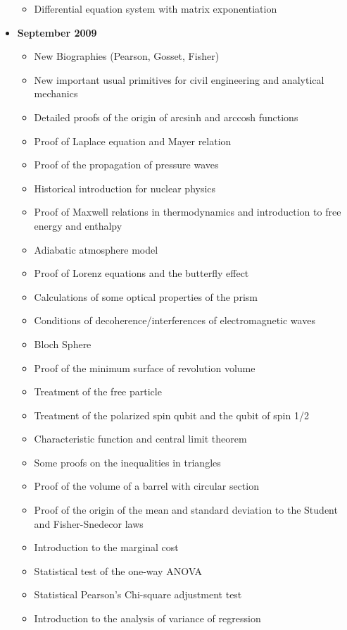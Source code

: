 \documentclass[12pt,a4paper,twoside,openright]{report}
\theoremstyle{definition}
\theoremstyle{itexmp}
\numberwithin{equation}{section}
\begin{document}
\begin{itemize}
\begin{itemize}[noitemsep]
			\item Differential equation system with matrix exponentiation
		\end{itemize}
	\item \textbf{September 2009}
		\begin{itemize}[noitemsep]
			\item New Biographies (Pearson, Gosset, Fisher)
			\item New important usual primitives for civil engineering and analytical mechanics
			\item Detailed proofs of the origin of arcsinh and arccosh functions
			\item Proof of Laplace equation and Mayer relation
			\item Proof of the propagation of pressure waves
			\item Historical introduction for nuclear physics
			\item Proof of Maxwell relations in thermodynamics and introduction to free energy and enthalpy
			\item Adiabatic atmosphere model
			\item Proof of Lorenz equations and the butterfly effect
			\item Calculations of some optical properties of the prism
			\item Conditions of decoherence/interferences of electromagnetic waves
			\item Bloch Sphere
			\item Proof of the minimum surface of revolution volume
			\item Treatment of the free particle
			\item Treatment of the polarized spin qubit and the qubit of spin 1/2
			\item Characteristic function and central limit theorem
			\item Some proofs on the inequalities in triangles
			\item Proof of the volume of a barrel with circular section 
			\item Proof of the origin of the mean and standard deviation to the Student and Fisher-Snedecor laws
			\item Introduction to the marginal cost
			\item Statistical test of the one-way ANOVA
			\item Statistical Pearson's Chi-square adjustment test  
			\item Introduction to the analysis of variance of regression

\end{itemize}
\end{itemize}
\end{document}
